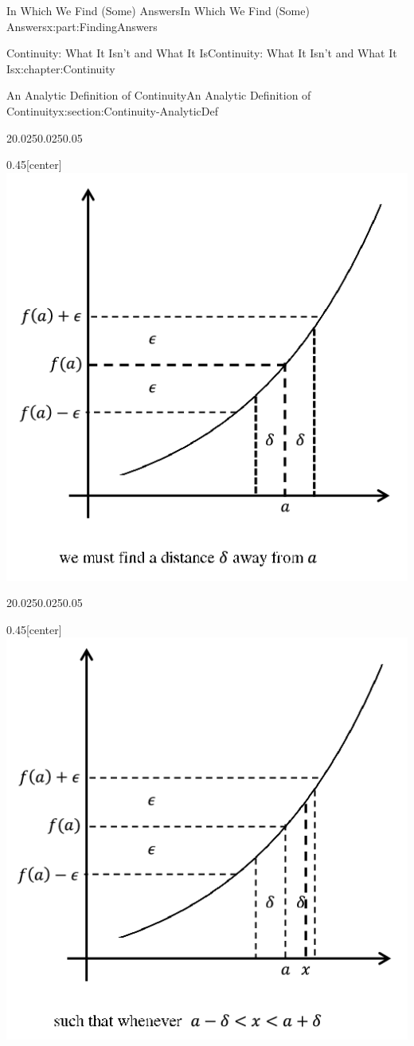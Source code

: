 \documentclass[oneside,10pt,]{book}
\numberwithin{equation}{section}
\begin{document}
\begin{partptx}{In Which We Find (Some) Answers}{}{In Which We Find (Some) Answers}{}{}{x:part:FindingAnswers}
\begin{chapterptx}{Continuity: What It Isn't and What It Is}{}{Continuity: What It Isn't and What It Is}{}{}{x:chapter:Continuity}
\begin{sectionptx}{An Analytic Definition of Continuity}{}{An Analytic Definition of Continuity}{}{}{x:section:Continuity-AnalyticDef}
\begin{sidebyside}{2}{0.025}{0.025}{0.05}
\begin{sbspanel}{0.45}[center]
\includegraphics[width=\linewidth]{images/Ch5fig3b.png}
\end{sbspanel}%
\end{sidebyside}%
\begin{sidebyside}{2}{0.025}{0.025}{0.05}%
\begin{sbspanel}{0.45}[center]%
\includegraphics[width=\linewidth]{images/Ch5fig3c.png}

\end{sbspanel}
\end{sidebyside}
\end{sectionptx}
\end{chapterptx}
\end{partptx}
\end{document}
